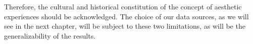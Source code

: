 Therefore, the cultural and historical constitution of the concept of aesthetic experiences should be acknowledged. The choice of our data sources, as we will see in the next chapter, will be subject to these two limitations, as will be the generalizability of the results.

